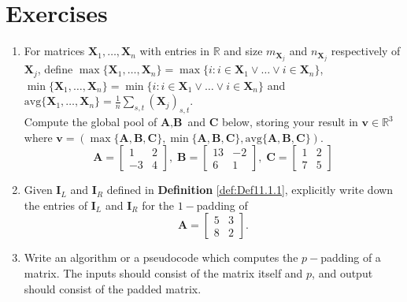 \section{Exercises}
\begin{enumerate}
    \item For matrices $\textbf{X}_1, \ldots, \textbf{X}_n$ with entries in $\mathbb{R}$ and size $m_{\textbf{X}_j}$ and $n_{\textbf{X}_j}$ respectively of $\textbf{X}_j$, define $\max\{{\textbf{X}_1,\ldots,\textbf{X}_n}\} = \max\{{i : i \in \textbf{X}_1 \vee \ldots \vee i \in \textbf{X}_n}\}$, $\min\{{\textbf{X}_1,\ldots,\textbf{X}_n}\} = \min\{{i : i \in \textbf{X}_1 \vee \ldots \vee i \in \textbf{X}_n}\}$ and $\text{avg}\{{\textbf{X}_1,\ldots,\textbf{X}_n}\} = \frac{1}{n}\sum_{s,t}(\textbf{X}_j)_{s,t}$.\\
    
    Compute the global pool of $\textbf{A},\textbf{B}$ and $\textbf{C}$ below, storing your result in $\textbf{v} \in \mathbb{R}^3$ where $\textbf{v} = ( \max\{\textbf{A},\textbf{B},\textbf{C} \}, \min\{\textbf{A},\textbf{B},\textbf{C} \},\text{avg}\{\textbf{A},\textbf{B},\textbf{C} \} )$.
        $$\textbf{A} = \begin{bmatrix}
                1 & 2 \\
                -3 & 4
            \end{bmatrix},\;\textbf{B} = \begin{bmatrix}
                13 & -2 \\
                6 & 1
            \end{bmatrix},\;\textbf{C} = \begin{bmatrix}
                1 & 2 \\
                7 & 5
            \end{bmatrix}$$
            
    \item Given $\textbf{I}_L$ and $\textbf{I}_R$ defined in \textbf{Definition }\ref{def:Def11.1.1}, explicitly write down the entries of $\textbf{I}_L$ and $\textbf{I}_R$ for the $1-$padding of 
    $$\textbf{A} = \begin{bmatrix}
        5 & 3 \\
        8 & 2
    \end{bmatrix}.$$
    
    \item Write an algorithm or a pseudocode which computes the $p-$padding of a matrix. The inputs should consist of the matrix itself and $p$, and output should consist of the padded matrix.
\end{enumerate}

